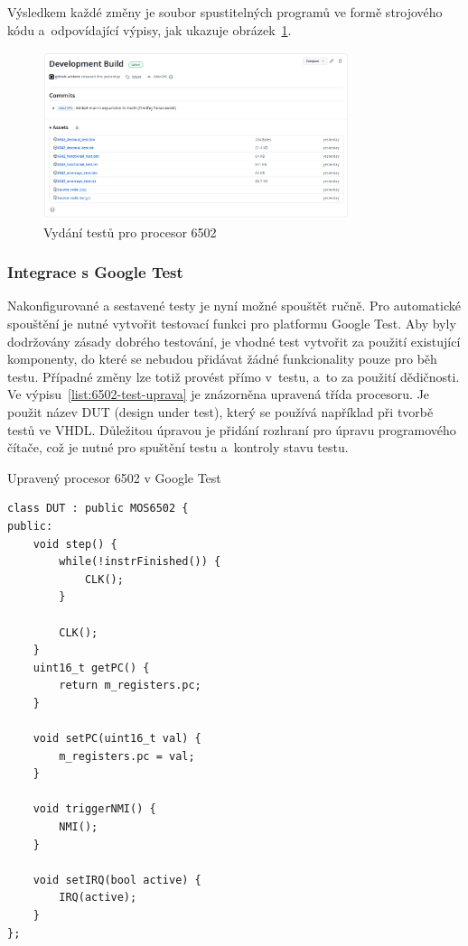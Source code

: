 Výsledkem každé změny je soubor spustitelných programů ve formě strojového kódu a~odpovídající výpisy, jak ukazuje obrázek~\ref{fig:vydani-testu-6502}.

\begin{figure}[ht!]
	\centering
	\caption{Vydání testů pro procesor 6502}
	\label{fig:vydani-testu-6502}
    \includegraphics[width=0.8\textwidth]{images/vydani-testu-6502.png}
\end{figure}

\subsubsection{Integrace s Google Test}
Nakonfigurované a sestavené testy je nyní možné spouštět ručně. Pro automatické spouštění je nutné vytvořit testovací funkci pro platformu Google Test. Aby byly dodržovány zásady dobrého testování, je vhodné test vytvořit za použití existující komponenty, do které se nebudou přidávat žádné funkcionality pouze pro běh testu. Případné změny lze totiž provést přímo v~testu, a~to za použití dědičnosti. Ve výpisu~\ref{list:6502-test-uprava} je znázorněna upravená třída procesoru. Je použit název DUT (design under test), který se používá například při tvorbě testů ve VHDL. Důležitou úpravou je přidání rozhraní pro úpravu programového čítače, což je nutné pro spuštění testu a~kontroly stavu testu.

\begin{listing}[htp!]
	\caption{Upravený procesor 6502 v Google Test}
	\label{list:6502-test-uprava}
	\begin{verbatim}
class DUT : public MOS6502 {
public:
	void step() {
		while(!instrFinished()) {
			CLK();
		}
		
		CLK();
	}
	uint16_t getPC() {
		return m_registers.pc;
	}

	void setPC(uint16_t val) {
		m_registers.pc = val;
	}

	void triggerNMI() {
		NMI();
	}

	void setIRQ(bool active) {
		IRQ(active);
	}
};
	\end{verbatim}
\end{listing}

